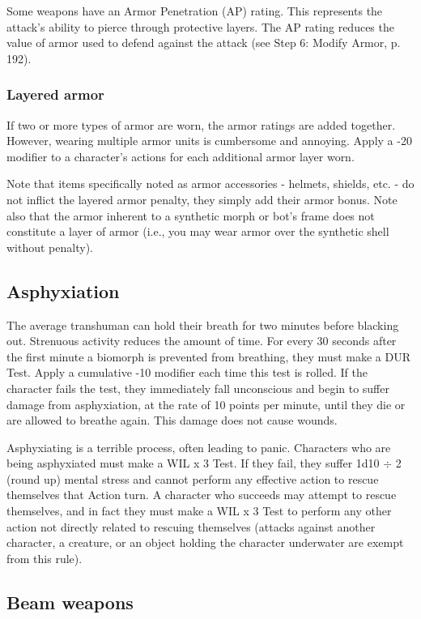 Some weapons have an Armor Penetration (AP) rating. This represents the attack’s ability to pierce through protective layers. The AP rating reduces the value of armor used to defend against the attack (see Step 6: Modify Armor, p. 192).

\subsubsection{Layered armor}

If two or more types of armor are worn, the armor ratings are added together. However, wearing multiple armor units is cumbersome and annoying. Apply a -20 modifier to a character’s actions for each additional armor layer worn.

Note that items specifically noted as armor accessories -  helmets, shields, etc. - do not inflict the layered armor penalty, they simply add their armor bonus. Note also that the armor inherent to a synthetic morph or bot’s frame does not constitute a layer of armor (i.e., you may wear armor over the synthetic shell without penalty).


\subsection{Asphyxiation}
\label{sec:asphyxiation}

The average transhuman can hold their breath for two minutes before blacking out. Strenuous activity reduces the amount of time. For every 30 seconds after the first minute a biomorph is prevented from breathing, they must make a DUR Test. Apply a cumulative -10 modifier each time this test is rolled. If the character fails the test, they immediately fall unconscious and begin to suffer damage from asphyxiation, at the rate of 10 points per minute, until they die or are allowed to breathe again. This damage does not cause wounds.

Asphyxiating is a terrible process, often leading to panic. Characters who are being asphyxiated must make a WIL x 3 Test. If they fail, they suffer 1d10 $\div$ 2 (round up) mental stress and cannot perform any effective action to rescue themselves that Action turn. A character who succeeds may attempt to rescue themselves, and in fact they must make a WIL x 3 Test to perform any other action not directly related to rescuing themselves (attacks against another character, a creature, or an object holding the character underwater are exempt from this rule).


\subsection{Beam weapons}
\label{sec:beam-weapons}

